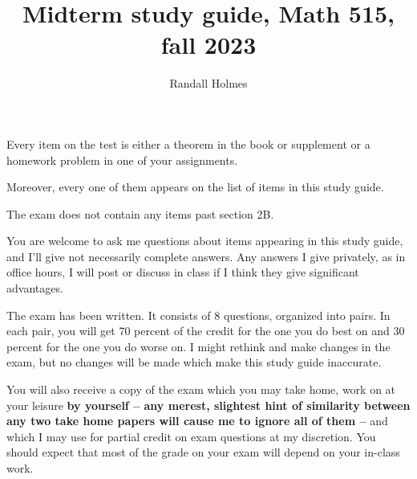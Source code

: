 \documentclass[12pt]{article}
\title{Midterm study guide, Math 515, fall 2023}
\author{Randall Holmes}
\begin{document}
\maketitle

Every item on the test is either a theorem in the book or supplement or a homework problem in one of your assignments.

Moreover, every one of them appears on the list of items in this study guide.

The exam does not contain any items past section 2B.

You are welcome to ask me questions about items appearing in this study guide, and I'll give not necessarily complete answers.  Any answers I give privately, as in office hours, I will post or discuss in class if I think they give significant advantages.

The exam has been written.  It consists of 8 questions, organized into pairs.  In each pair, you will get 70 percent of the credit for the one you do best on and 30 percent for the one you do worse on.  I might rethink and make changes in the exam, but no changes will be made which make this study guide inaccurate.

You will also receive a copy of the exam which you may take home, work on at your leisure {\bf by yourself -- any merest, slightest  hint of similarity between any two take home papers  will cause me to ignore all of them --}
and which I may use for partial credit on exam questions at my discretion.   You should expect that most of the grade on your exam will depend on your in-class work.
\end{document}
